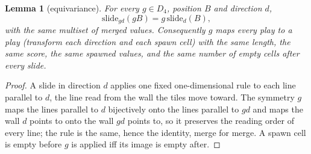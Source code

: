\documentclass[11pt]{article}
\newtheorem{lemma}[theorem]{Lemma}
\theoremstyle{definition}
\theoremstyle{remark}
\newcommand{\Dfour}{D_4}
\begin{document}
\begin{lemma}[equivariance]\label{lem:equiv}
For every $g\in\Dfour$, position $B$ and direction $d$,
\[
\mathrm{slide}_{gd}(gB)=g\,\mathrm{slide}_d(B),
\]
with the same multiset of merged values. Consequently $g$ maps every play
to a play (transform each direction and each spawn cell) with the same
length, the same score, the same spawned values, and the same number of
empty cells after every slide.
\end{lemma}
\begin{proof}
A slide in direction $d$ applies one fixed one-dimensional rule to each
line parallel to $d$, the line read from the wall the tiles move toward.
The symmetry $g$ maps the lines parallel to $d$ bijectively onto the lines
parallel to $gd$ and maps the wall $d$ points to onto the wall $gd$ points
to, so it preserves the reading order of every line; the rule is the same,
hence the identity, merge for merge. A spawn cell is empty before $g$ is
applied iff its image is empty after.
\end{proof}
\end{document}
